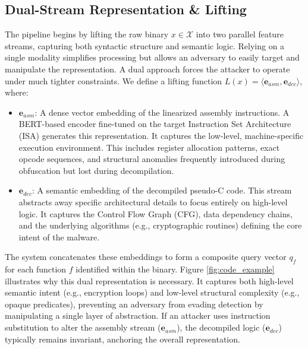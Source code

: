 \documentclass[pdflatex,sn-mathphys-num]{sn-jnl}
\begin{document}
\subsection{Dual-Stream Representation \& Lifting}
The pipeline begins by lifting the raw binary $x \in \mathcal{X}$ into two parallel feature streams, capturing both syntactic structure and semantic logic. Relying on a single modality simplifies processing but allows an adversary to easily target and manipulate the representation. A dual approach forces the attacker to operate under much tighter constraints. We define a lifting function $L(x) = \langle \mathbf{e}_{asm}, \mathbf{e}_{dec} \rangle$, where:
\begin{itemize}
    \item $\mathbf{e}_{asm}$: A dense vector embedding of the linearized assembly instructions. A BERT-based encoder fine-tuned on the target Instruction Set Architecture (ISA) generates this representation. It captures the low-level, machine-specific execution environment. This includes register allocation patterns, exact opcode sequences, and structural anomalies frequently introduced during obfuscation but lost during decompilation.
    \item $\mathbf{e}_{dec}$: A semantic embedding of the decompiled pseudo-C code. This stream abstracts away specific architectural details to focus entirely on high-level logic. It captures the Control Flow Graph (CFG), data dependency chains, and the underlying algorithms (e.g., cryptographic routines) defining the core intent of the malware.
\end{itemize}
The system concatenates these embeddings to form a composite query vector $q_f$ for each function $f$ identified within the binary. Figure \ref{fig:code_example} illustrates why this dual representation is necessary. It captures both high-level semantic intent (e.g., encryption loops) and low-level structural complexity (e.g., opaque predicates), preventing an adversary from evading detection by manipulating a single layer of abstraction. If an attacker uses instruction substitution to alter the assembly stream ($\mathbf{e}_{asm}$), the decompiled logic ($\mathbf{e}_{dec}$) typically remains invariant, anchoring the overall representation.
\end{document}
